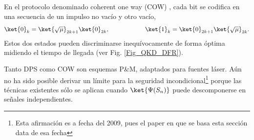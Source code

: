 \documentclass[a4paper,11pt]{book} %
\numberwithin{equation}{chapter}
\begin{document}
En el protocolo denominado coherent one way (COW) \cite{Phase_gisin2004practical,Phase_Stucki_2005}, cada bit se codifica en una secuencia de un impulso no vacío y otro vacío,
	\begin{equation}
	\ket{0}_k = \ket{\sqrt{\mu}}_{2k+1} \ket{0}_{2k}, \hspace{2cm} 
	\ket{1}_k = \ket{0}_{2k+1} \ket{\sqrt{\mu}}_{2k}.
	\end{equation}
Estos dos estados pueden discriminarse inequívocamente de forma óptima midiendo el tiempo de llegada (ver Fig. \ref{Fig_QKD_DFR}). 

Tanto DPS como COW son esquemas P\&M, adaptados para fuentes láser. Aún no ha sido posible derivar un límite para la seguridad incondicional\footnote{Esta afirmación es a fecha del 2009, pues el paper en que se basa esta sección \cite{QKD_resumen} data de esa fecha} porque las técnicas existentes sólo se aplican cuando $\ket{\Psi (S_n)}$ puede descomponerse en señales independientes. 
		
	
	
		
	
		
		
	

	

\end{document}
